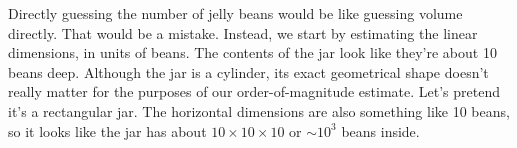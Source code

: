 Directly guessing the number of jelly beans would be like guessing volume directly. That
would be a mistake. Instead, we start by estimating the linear dimensions, in units of
beans. The contents of the jar look like they're about 10 beans deep. Although the jar
is a cylinder, its exact geometrical shape doesn't really matter for the purposes of
our order-of-magnitude estimate. Let's pretend it's a rectangular jar. The horizontal
dimensions are also something like 10 beans, so it looks like the jar has about
$10\times 10 \times 10$ or $\sim 10^3$ beans inside.



